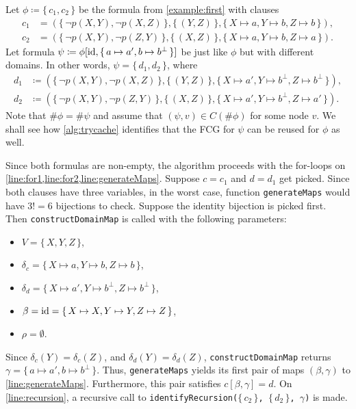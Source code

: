 \begin{example}\label{example}

  Let $\phi \coloneqq \{\, c_1, c_2 \,\}$ be the formula from
  \cref{example:first} with clauses
  \begin{align*}
    c_1 &= (\{\, \neg p(X, Y), \neg p(X, Z) \,\}, \{\, (Y, Z) \,\}, \{\, X \mapsto a, Y \mapsto b, Z \mapsto b \,\}), \\
    c_2 &= (\{\, \neg p(X, Y), \neg p(Z, Y) \,\}, \{\, (X, Z) \,\}, \{\, X \mapsto a, Y \mapsto b, Z \mapsto a \,\}).
  \end{align*}
  Let formula
  $\psi \coloneqq \phi[\operatorname{id}, \{\, a \mapsto a', b \mapsto b^\bot \,\}]$ be just
  like $\phi$ but with different domains. In other words,
  $\psi = \{\, d_1, d_2 \,\}$, where
  \begin{align*}
    d_1 &\coloneqq (\{\, \neg p(X, Y), \neg p(X, Z) \,\}, \{\, (Y, Z) \,\}, \{\, X \mapsto a', Y \mapsto b^\bot, Z \mapsto b^\bot \,\}),\\
    d_2 &\coloneqq (\{\, \neg p(X, Y), \neg p(Z, Y) \,\}, \{\, (X, Z) \,\}, \{\, X \mapsto a', Y \mapsto b^\bot, Z \mapsto a' \,\}).
  \end{align*}
  Note that $\#\phi = \#\psi$ and assume that $(\psi, v) \in C(\#\phi)$ for some
  node $v$. We shall see how \cref{alg:trycache} identifies that the FCG for
  $\psi$ can be reused for $\phi$ as well.

  Since both formulas are non-empty, the algorithm proceeds with the for-loops
  on \cref{line:for1,line:for2,line:generateMaps}. Suppose $c = c_1$ and
  $d = d_1$ get picked. Since both clauses have three variables, in the worst
  case, function \texttt{generateMaps} would have $3!=6$ bijections to check.
  Suppose the identity bijection is picked first. Then
  \texttt{constructDomainMap} is called with the following parameters:
  \begin{itemize}
    \item $V = \{\, X, Y, Z \,\}$,
    \item $\delta_c = \{\, X \mapsto a, Y \mapsto b, Z \mapsto b \,\}$,
    \item
          $\delta_d = \{\, X \mapsto a', Y \mapsto b^\bot, Z \mapsto b^\bot \,\}$,
    \item $\beta = \operatorname{id} = \{\, X \mapsto X, Y \mapsto Y, Z \mapsto Z \,\}$,
    \item $\rho = \emptyset$.
  \end{itemize}
  Since $\delta_c(Y) = \delta_c(Z)$, and $\delta_d(Y) = \delta_d(Z)$,
  \texttt{constructDomainMap} returns
  $\gamma = \{\, a \mapsto a', b \mapsto b^\bot \,\}$. Thus,
  \texttt{generateMaps} yields its first pair of maps $(\beta, \gamma)$ to
  \cref{line:generateMaps}. Furthermore, this pair satisfies
  $c[\beta, \gamma] = d$. On \cref{line:recursion}, a recursive call to
  \texttt{identifyRecursion($\{\,c_2\,\}$, $\{\,d_2\,\}$, $\gamma$)} is made.


\end{example}
